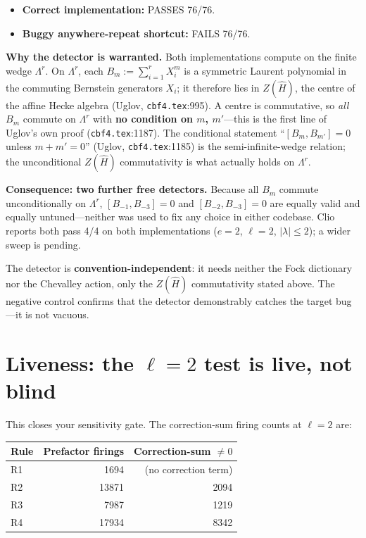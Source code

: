 \documentclass[11pt,a4paper]{article}
\begin{document}
\begin{itemize}[nosep]
  \item \textbf{Correct implementation:} PASSES 76/76.
  \item \textbf{Buggy anywhere-repeat shortcut:} FAILS 76/76.
\end{itemize}

\textbf{Why the detector is warranted.}
Both implementations compute on the finite wedge $\Lambda^r$.  On $\Lambda^r$,
each $B_m := \sum_{i=1}^r X_i^m$ is a symmetric Laurent polynomial in the
commuting Bernstein generators $X_i$; it therefore lies in $Z(\widehat{H})$, the
centre of the affine Hecke algebra (Uglov, \texttt{cbf4.tex}:995).  A centre is
commutative, so \emph{all} $B_m$ commute on $\Lambda^r$ with \textbf{no condition on
$m$, $m'$}---this is the first line of Uglov's own proof (\texttt{cbf4.tex}:1187).
The conditional statement ``$[B_m, B_{m'}]=0$ unless $m+m'=0$'' (Uglov,
\texttt{cbf4.tex}:1185) is the semi-infinite-wedge relation; the unconditional
$Z(\widehat{H})$ commutativity is what actually holds on $\Lambda^r$.

\textbf{Consequence: two further free detectors.}
Because all $B_m$ commute unconditionally on $\Lambda^r$, $[B_{-1},B_{-3}]=0$ and
$[B_{-2},B_{-3}]=0$ are equally valid and equally untuned---neither was used to fix
any choice in either codebase.  Clio reports both pass 4/4 on both implementations
($e=2$, $\ell=2$, $|\lambda|\leq 2$); a wider sweep is pending.

The detector is \textbf{convention-independent}: it needs neither the Fock dictionary nor
the Chevalley action, only the $Z(\widehat{H})$ commutativity stated above.  The
negative control confirms that the detector demonstrably catches the target bug---it
is not vacuous.

\section{Liveness: the $\ell=2$ test is live, not blind}

This closes your sensitivity gate.  The correction-sum firing counts at $\ell=2$ are:

\begin{center}
\begin{tabular}{lrr}
\hline
Rule & Prefactor firings & Correction-sum $\neq 0$ \\
\hline
R1 & 1694 & (no correction term) \\
R2 & 13871 & 2094 \\
R3 & 7987 & 1219 \\
R4 & 17934 & 8342 \\
\hline
\end{tabular}
\end{center}
\end{document}
